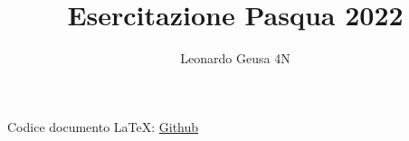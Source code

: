 \documentclass[12pt]{article}
\begin{document}
\title{Esercitazione Pasqua 2022}
\date{}
\author{Leonardo Geusa 4N}
\setcounter{section}{-1}
\maketitle


\newpage
\vspace*{3cm}
\tableofcontents



\raggedright

























\vspace*{\fill}
Codice documento LaTeX: \href{https://github.com/Leoooog/EsercitazionePasqua}{Github}
\end{document}
